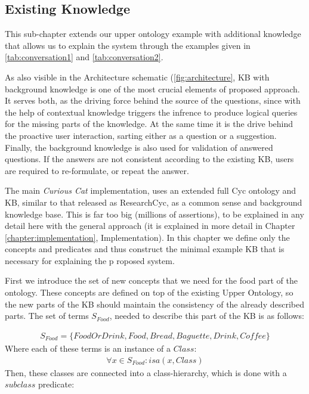 \subsection{Existing Knowledge}
\label{section:existingKB}
This sub-chapter extends our upper ontology example with additional knowledge
that allows us to explain the system through the examples given in 
\autoref{tab:conversation1} and \autoref{tab:conversation2}. 

As also visible in the Architecture schematic (\autoref{fig:architecture},
KB with background knowledge is one of the most crucial elements of proposed 
approach. It serves both, as the driving force behind the source of the 
questions, since with the help of contextual knowledge triggers the infrence to
produce logical queries for the missing parts of the knowledge. At the same time
it is the drive behind the proactive user interaction, sarting either as a
question or a suggestion. Finally, the background knowledge is also used for 
validation of answered questions. If the answers are not consistent according
to the existing KB, users are required to re-formulate, or repeat the answer.

The main \emph{Curious Cat} implementation, uses an extended 
full Cyc ontology and KB, similar to that released as ResearchCyc, as a 
common sense and background knowledge base. This is far too big (millions of 
assertions), to be explained in any detail here with the general approach (it 
is explained in more detail in Chapter \ref{chapter:implementation}, 
Implementation). In this chapter we define only the concepts and predicates 
and thus construct the minimal example KB that is necessary for explaining the p
roposed system.

First we introduce the set of new concepts that we need for the food part
of the ontology. These concepts are defined on top of the existing Upper 
Ontology, so the new parts of the KB should maintain the consistency of the
already described parts. The set of terms $S_{Food} $, needed to describe this 
part of the KB is as follows:

\begin{equation}\label{set:foodTerms}
\begin{gathered}
S_{Food} = \{FoodOrDrink,Food,Bread,Baguette,Drink,Coffee\}
\end{gathered}
\end{equation}
Where each of these terms is an instance of a $Class$:
\begin{equation}\label{set:foodTermsClass}
\begin{gathered}
\forall x \in S_{Food}: isa(x,Class)
\end{gathered}
\end{equation}
Then, these classes are connected into a class-hierarchy, which is done with
a $subclass$ predicate:

